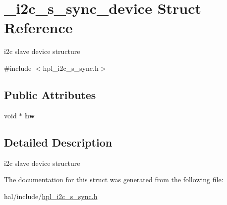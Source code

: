 \hypertarget{struct__i2c__s__sync__device}{}\section{\+\_\+i2c\+\_\+s\+\_\+sync\+\_\+device Struct Reference}
\label{struct__i2c__s__sync__device}


i2c slave device structure  




{\ttfamily \#include $<$hpl\+\_\+i2c\+\_\+s\+\_\+sync.\+h$>$}

\subsection*{Public Attributes}
\begin{DoxyCompactItemize}
\item 
\mbox{\label{struct__i2c__s__sync__device_ae16493c6e77fb00a796d352dcadfeb1d}} 
void $\ast$ {\bfseries hw}
\end{DoxyCompactItemize}


\subsection{Detailed Description}
i2c slave device structure 

The documentation for this struct was generated from the following file\+:\begin{DoxyCompactItemize}
\item 
hal/include/\hyperlink{hpl__i2c__s__sync_8h}{hpl\+\_\+i2c\+\_\+s\+\_\+sync.\+h}\end{DoxyCompactItemize}
